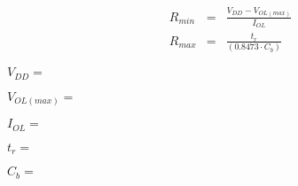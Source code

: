 \documentclass{article}
\begin{document}
\begin{eqnarray*}
R_{min} &=& \frac{V_{DD} - V_{OL(max)}} {I_{OL}}\\
R_{max} &=& \frac{t_r} {(0.8473 \cdot C_b)}
\end{eqnarray*}
\pagebreak

$ V_{DD} =$
\pagebreak

$ V_{OL(max)} =$
\pagebreak

$ I_{OL} =$
\pagebreak

$ t_r =$
\pagebreak

$ C_b =$
\pagebreak
\end{document}

